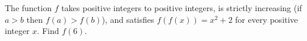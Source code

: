 The function $f$ takes positive integers to positive integers, is strictly increasing (if $a>b$ then $f(a)>f(b)$), and satisfies $f(f(x))=x^2+2$ for every positive integer $x$. Find $f(6)$.
